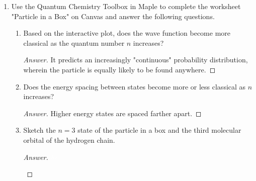 \documentclass[../psets.tex]{subfiles}
\begin{document}
\begin{enumerate}
\begin{enumerate}
\begin{proof}[Answer]
            \begin{align*}
                \alpha &= \frac{\sqrt{2m\cdot 8}}{\hbar}&
                    \beta &= \frac{\sqrt{2m\cdot 0}}{\hbar}\\
                &= \frac{4}{\hbar}\sqrt{m}&
                    &= 0
            \end{align*}
            Thus, we have that
            \begin{align*}
                R &= \frac{(\alpha-\beta)^2}{(\alpha+\beta)^2}&
                    T &= \frac{4\alpha\beta}{(\alpha+\beta)^2}\\
                &= \frac{\left( \frac{4}{\hbar}\sqrt{m}-0 \right)^2}{\left( \frac{4}{\hbar}\sqrt{m}+0 \right)^2}&
                    &= \frac{4\cdot\frac{4}{\hbar}\sqrt{m}\cdot 0}{\left( \frac{4}{\hbar}\sqrt{m}+0 \right)^2}\\
                \Aboxed{R &= 1}&
                    \Aboxed{T &= 0}
            \end{align*}
        \end{proof}
    \end{enumerate}
    \item Use the Quantum Chemistry Toolbox in Maple to complete the worksheet "Particle in a Box" on Canvas and answer the following questions.
    \begin{enumerate}
        \item Based on the interactive plot, does the wave function become more classical as the quantum number $n$ increases?
        \begin{proof}[Answer]
             It predicts an increasingly "continuous" probability distribution, wherein the particle is equally likely to be found anywhere.
        \end{proof}
        \item Does the energy spacing between states become more or less classical as $n$ increases?
        \begin{proof}[Answer]
             Higher energy states are spaced farther apart.
        \end{proof}
        \item Sketch the $n=3$ state of the particle in a box and the third molecular orbital of the hydrogen chain.
        \begin{proof}[Answer]
            ${\color{white}hi}$
            \begin{figure}[H]
                \centering
                \begin{subfigure}[b]{0.4\linewidth}

\end{subfigure}
\end{figure}
\end{proof}
\end{enumerate}
\end{enumerate}
\end{document}
